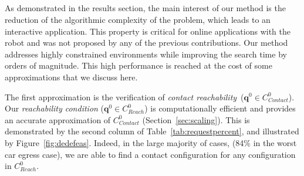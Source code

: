 \documentclass[journal]{IEEEtran}
\newcommand{\contactreachability}{\textit{contact reachability}}	%
\newcommand{\gls}[1]{\textit{#1}}
\providecommand{\DIFdeltex}[1]{} %
\providecommand{\DIFdelbegin}{\protect\cbdelete} %
\providecommand{\DIFdelend}{} %
\providecommand{\DIFdel}[1]{\texorpdfstring{\DIFdeltex{#1}}{}} %
\begin{document}
\DIFdelbegin \subsection{\DIFdel{Accuracy and performance gain of the reachability condition}}
\addtocounter{subsection}{-1}%
\DIFdelend %

As demonstrated in the results section, the main interest of our method is the reduction of the algorithmic complexity of the problem, which leads to an interactive 
application. This property is critical for 
online applications with the robot and was not proposed by any of the previous contributions. Our method addresses highly constrained environments while improving the search time by orders of magnitude. This high performance is reached at the cost of some approximations that we discuss here. 

The first approximation is the verification of \contactreachability\ ($\mathbf{q}^0 \in C_{Contact}^0$).  Our \textit{reachability condition} ($\mathbf{q}^0 \in C_{Reach}^0$) is computationally efficient and provides an accurate approximation of $C_{Contact}^0$ (Section~\ref{sec:scaling}). This is demonstrated by the second column of Table~\ref{tab:requestpercent}, and illustrated by Figure~\ref{fig:dedefeas}. Indeed, in the large majority of cases, (84\% in the worst car egress case), we are able to find a contact configuration for any configuration in $C_{Reach}^0$.

\end{document}
